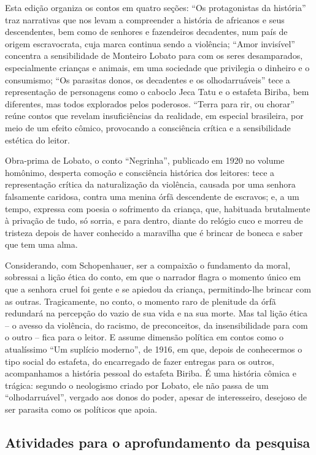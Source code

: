 \documentclass[11pt]{extarticle}
\begin{document}
Esta edição organiza os contos em quatro seções: ``Os protagonistas da
história'' traz narrativas que nos levam a compreender a história de
africanos e seus descendentes, bem como de senhores e fazendeiros
decadentes, num país de origem escravocrata, cuja marca continua sendo a
violência; ``Amor invisível'' concentra a sensibilidade de Monteiro
Lobato para com os seres desamparados, especialmente crianças e animais,
em uma sociedade que privilegia o dinheiro e o consumismo; ``Os
parasitas donos, os decadentes e os olhodarruáveis'' tece a
representação de personagens como o caboclo Jeca Tatu e o estafeta
Biriba, bem diferentes, mas todos explorados pelos poderosos. ``Terra
para rir, ou chorar'' reúne contos que revelam insuficiências da
realidade, em especial brasileira, por meio de um efeito cômico,
provocando a consciência crítica e a sensibilidade estética do leitor.

Obra-prima de Lobato, o conto ``Negrinha'', publicado em 1920 no volume
homônimo, desperta comoção e consciência histórica dos leitores: tece a
representação crítica da naturalização da violência, causada por uma
senhora falsamente caridosa, contra uma menina órfã descendente de
escravos; e, a um tempo, expressa com poesia o sofrimento da criança,
que, habituada brutalmente à privação de tudo, só sorria, e para dentro,
diante do relógio cuco e morreu de tristeza depois de haver conhecido a
maravilha que é brincar de boneca e saber que tem uma alma.

Considerando, com Schopenhauer, ser a compaixão o fundamento da moral,
sobressai a lição ética do conto, em que o narrador flagra o momento
único em que a senhora cruel foi gente e se apiedou da criança,
permitindo-lhe brincar com as outras. Tragicamente, no conto, o momento
raro de plenitude da órfã redundará na percepção do vazio de sua vida e
na sua morte. Mas tal lição ética -- o avesso da violência, do racismo,
de preconceitos, da insensibilidade para com o outro -- fica para o
leitor. E assume dimensão política em contos como o atualíssimo ``Um
suplício moderno'', de 1916, em que, depois de conhecermos o tipo social
do estafeta, do encarregado de fazer entregas para os outros,
acompanhamos a história pessoal do estafeta Biriba. É uma história
cômica e trágica: segundo o neologismo criado por Lobato, ele não passa
de um ``olhodarruável'', vergado aos donos do poder, apesar de
interesseiro, desejoso de ser parasita como os políticos que apoia.

\subsection{Atividades para o aprofundamento da pesquisa}
\end{document}
